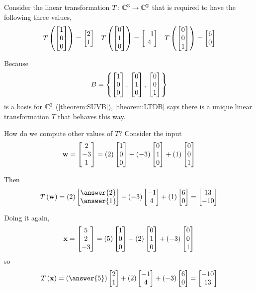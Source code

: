 \documentclass{ximera}
\begin{document}
\begin{example}

Consider the linear transformation $T\colon \mathbb{C}^{3}\rightarrow\mathbb{C}^{2}$ that is required to have the following three values,
\begin{align*}
T\left(\begin{bmatrix}1\\0\\0\end{bmatrix}\right)=\begin{bmatrix}2\\1\end{bmatrix}&&
T\left(\begin{bmatrix}0\\1\\0\end{bmatrix}\right)=\begin{bmatrix}-1\\4\end{bmatrix}&&
T\left(\begin{bmatrix}0\\0\\1\end{bmatrix}\right)=\begin{bmatrix}6\\0\end{bmatrix}
\end{align*}

Because
\[
B=\left\{
\begin{bmatrix}1\\0\\0\end{bmatrix},\,
\begin{bmatrix}0\\1\\0\end{bmatrix},\,
\begin{bmatrix}0\\0\\1\end{bmatrix}
\right\}
\]
is a basis for $\mathbb{C}^{3}$ (\ref{theorem:SUVB}), \ref{theorem:LTDB} says there is a unique linear transformation $T$ that behaves this way.

How do we compute other values of $T$?  Consider the input
\[
\mathbf{w}=\begin{bmatrix}2\\-3\\1\end{bmatrix}=(2)\begin{bmatrix}1\\0\\0\end{bmatrix}+(-3)\begin{bmatrix}0\\1\\0\end{bmatrix}+(1)\begin{bmatrix}0\\0\\1\end{bmatrix}
\]

Then
\[
\lteval{T}{\vect{w}}=(2)\colvector{\answer{2}\\\answer{1}}+ (-3)\colvector{-1\\4}+ (1)\colvector{6\\0}=\colvector{13\\-10}
\]

Doing it again,
\[
\mathbf{x}=\begin{bmatrix}5\\2\\-3\end{bmatrix}=(5)\begin{bmatrix}1\\0\\0\end{bmatrix}+(2)\begin{bmatrix}0\\1\\0\end{bmatrix}+(-3)\begin{bmatrix}0\\0\\1\end{bmatrix}
\]
so
\[
\lteval{T}{\vect{x}}=(\answer{5})\colvector{2\\1}+ (2)\colvector{-1\\4}+ (-3)\colvector{6\\0}=\colvector{-10\\13}
\]



\end{example}
\end{document}

